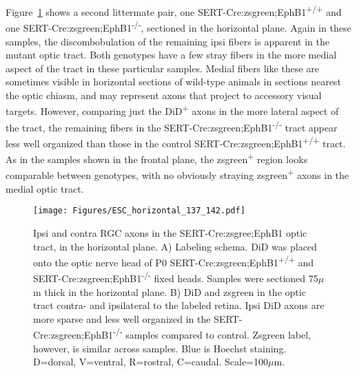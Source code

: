 Figure~\ref{ESChorizontal} shows a second littermate pair, one SERT-Cre:zsgreen;EphB1\textsuperscript{+/+} and one SERT-Cre:zsgreen;EphB1\textsuperscript{-/-}, sectioned in the horizontal plane.
Again in these samples, the discombobulation of the remaining ipsi fibers is apparent in the mutant optic tract.
Both genotypes have a few stray fibers in the more medial aspect of the tract in these particular samples.
Medial fibers like these are sometimes visible in horizontal sections of wild-type animals in sections nearest the optic chiasm, and may represent axons that project to accessory visual targets.
However, comparing just the DiD\textsuperscript{+} axons in the more lateral aspect of the tract, the remaining fibers in the SERT-Cre:zsgreen;EphB1\textsuperscript{-/-} tract appear less well organized than those in the control SERT-Cre:zsgreen;EphB1\textsuperscript{+/+} tract.
As in the samples shown in the frontal plane, the zsgreen\textsuperscript{+} region looks comparable between genotypes, with no obviously straying zsgreen\textsuperscript{+} axons in the medial optic tract.
\begin{figure}[hbtp]
    \begin{center}
        \texttt{[image: Figures/ESC\_horizontal\_137\_142.pdf]}
        \caption[Ipsi and contra RGC axons in the SERT-Cre:zsgree;EphB1 optic tract, in the horizontal plane.]
        {Ipsi and contra RGC axons in the SERT-Cre:zsgree;EphB1 optic tract, in the horizontal plane.
        A) Labeling schema.
        DiD was placed onto the optic nerve head of P0 SERT-Cre:zsgreen;EphB1\textsuperscript{+/+} and SERT-Cre:zsgreen;EphB1\textsuperscript{-/-} fixed heads.
        Samples were sectioned 75$\mu$m thick in the horizontal plane.
        B) DiD and zsgreen in the optic tract contra- and ipsilateral to the labeled retina.
        Ipsi DiD axons are more sparse and less well organized in the SERT-Cre:zsgreen;EphB1\textsuperscript{-/-} samples compared to control.
        Zsgreen label, however, is similar across samples.
        Blue is Hoechst staining.
        D=dorsal, V=ventral, R=rostral, C=caudal.
        Scale=100$\mu$m.}
        \label{ESChorizontal}
    \end{center}
\end{figure}

